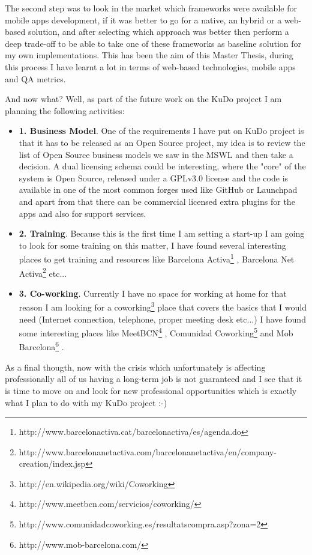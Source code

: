 \documentclass[a4paper,12pt]{book}
\begin{document}
The second step was to look in the market which frameworks were available for mobile apps development, if it was better to go for a native, an hybrid or a web-based solution, and after selecting which approach was better then perform a deep trade-off to be able to take one of these frameworks as baseline solution for my own implementations. This has been the aim of this Master Thesis, during this process I have learnt a lot in terms of web-based technologies, mobile apps and QA metrics.

And now what? Well, as part of the future work on the KuDo project I am planning the following activities:

\begin{itemize}
 \item \textbf{1. Business Model}. One of the requirements I have put on KuDo project is that it has to be  released as an Open Source project, my idea is to review the list of Open Source business models we saw in the MSWL and then take a decision. A dual licensing schema could be interesting, where the "core" of the system is Open Source, released under a GPLv3.0 license and the code is available in one of the most common forges used like GitHub or Launchpad and apart from that there can be commercial licensed extra plugins for the apps and also for support services.
 \item \textbf{2. Training}. Because this is the first time I am setting a start-up I am going to look for some training on this matter, I have found several interesting places to get training and resources like Barcelona Activa\footnote{http://www.barcelonactiva.cat/barcelonactiva/es/agenda.do} , Barcelona Net Activa\footnote{http://www.barcelonanetactiva.com/barcelonanetactiva/en/company-creation/index.jsp} etc...
 \item \textbf{3. Co-working}. Currently I have no space for working at home for that reason I am looking for a coworking\footnote{http://en.wikipedia.org/wiki/Coworking} place that covers the basics that I would need (Internet connection, telephone, proper meeting desk etc...) I have found some interesting places like MeetBCN\footnote{http://www.meetbcn.com/servicios/coworking/} , Comunidad Coworking\footnote{http://www.comunidadcoworking.es/resultatscompra.asp?zona=2}  and Mob Barcelona\footnote{http://www.mob-barcelona.com/} .
\end{itemize}

As a final thougth, now with the crisis which unfortunately is affecting professionally all of us having a long-term job is not guaranteed and I see that it is time to move on and look for new professional opportunities which is exactly what I plan to do with my KuDo project :-)
\end{document}
